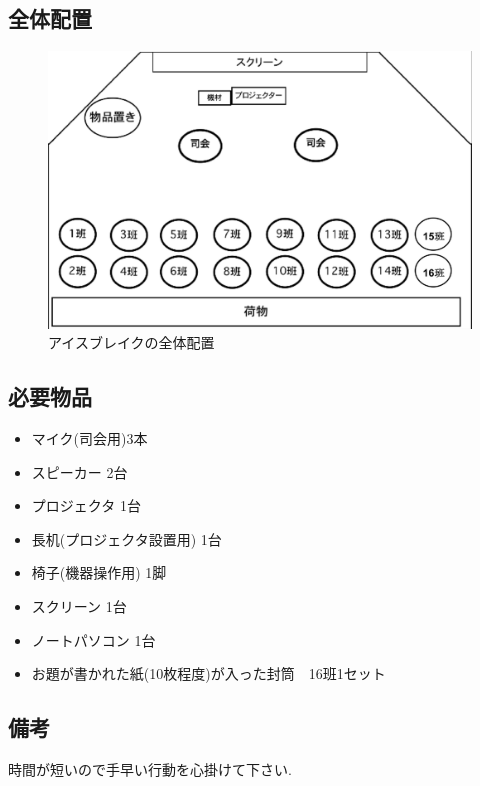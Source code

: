 \documentclass[a4j,titlepage]{jarticle}
\begin{document}
\subsection{全体配置}
\begin{figure}[h]
  \begin{center}
    \includegraphics[scale=0.5]{./21/ice.eps}
    \caption{アイスブレイクの全体配置}
    \label{fig:ice}
  \end{center}
\end{figure}


\subsection{必要物品}
\begin{itemize}
\item マイク(司会用)3本
\item スピーカー 2台
\item プロジェクタ 1台
\item 長机(プロジェクタ設置用) 1台
\item 椅子(機器操作用) 1脚
\item スクリーン 1台
\item ノートパソコン 1台
\item お題が書かれた紙(10枚程度)が入った封筒　16班1セット
\end{itemize}


\subsection{備考}
時間が短いので手早い行動を心掛けて下さい.

%
\end{document}
